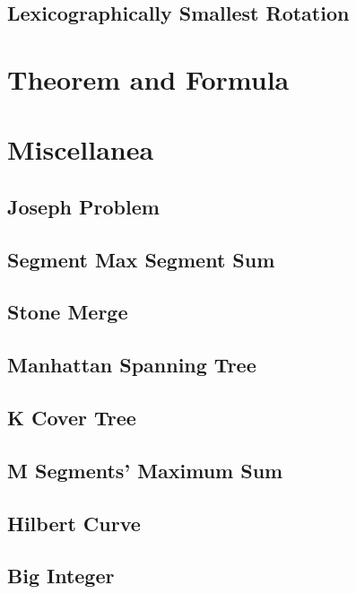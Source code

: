 \documentclass[a4paper,10pt,twocolumn,oneside]{article}
\begin{document}
\subsection{Lexicographically Smallest Rotation}


\section{Theorem and Formula}


\section{Miscellanea}

\subsection{Joseph Problem}


\subsection{Segment Max Segment Sum}


\subsection{Stone Merge}


\subsection{Manhattan Spanning Tree}


\subsection{K Cover Tree}


\subsection{M Segments' Maximum Sum}


%

%

\subsection{Hilbert Curve}


\subsection{Big Integer}

\end{document}
